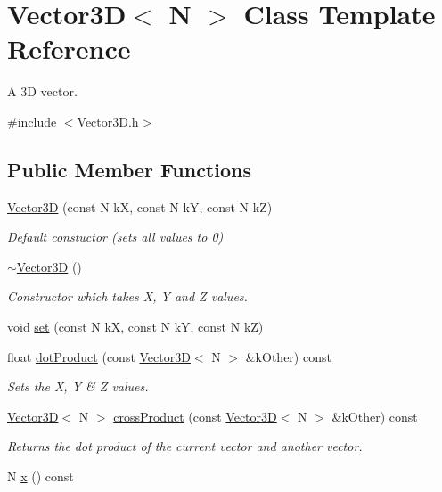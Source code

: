 \hypertarget{class_vector3_d}{\section{Vector3\+D$<$ N $>$ Class Template Reference}
\label{class_vector3_d}
}


A 3\+D vector.  




{\ttfamily \#include $<$Vector3\+D.\+h$>$}

\subsection*{Public Member Functions}
\begin{DoxyCompactItemize}
\item 
\hyperlink{class_vector3_d_a3f09cc868db69de841d2b66c09b1c949}{Vector3\+D} (const N k\+X, const N k\+Y, const N k\+Z)
\begin{DoxyCompactList}\small\item\em Default constuctor (sets all values to 0) \end{DoxyCompactList}\item 
\hyperlink{class_vector3_d_aa7cb6c808761b775a5fcf37a2e3ddb79}{$\sim$\+Vector3\+D} ()
\begin{DoxyCompactList}\small\item\em Constructor which takes X, Y and Z values. \end{DoxyCompactList}\item 
void \hyperlink{class_vector3_d_a81aa36b296f62c3b124198d52e06e88e}{set} (const N k\+X, const N k\+Y, const N k\+Z)
\item 
float \hyperlink{class_vector3_d_ae4b264f0d1cc18bbe4f135ba623c7767}{dot\+Product} (const \hyperlink{class_vector3_d}{Vector3\+D}$<$ N $>$ \&k\+Other) const 
\begin{DoxyCompactList}\small\item\em Sets the X, Y \& Z values. \end{DoxyCompactList}\item 
\hyperlink{class_vector3_d}{Vector3\+D}$<$ N $>$ \hyperlink{class_vector3_d_ab219d86f968d30e7c95783eefd21246f}{cross\+Product} (const \hyperlink{class_vector3_d}{Vector3\+D}$<$ N $>$ \&k\+Other) const 
\begin{DoxyCompactList}\small\item\em Returns the dot product of the current vector and another vector. \end{DoxyCompactList}\item 
\hypertarget{class_vector3_d_aa8d6b91fa4840dc252f563038dda8da6}{N \hyperlink{class_vector3_d_aa8d6b91fa4840dc252f563038dda8da6}{x} () const }\label{class_vector3_d_aa8d6b91fa4840dc252f563038dda8da6}


\end{DoxyCompactItemize}
